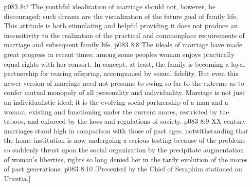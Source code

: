 \vs p083 8:7 The youthful idealization of marriage should not, however, be discouraged; such dreams are the visualization of the future goal of family life. This attitude is both stimulating and helpful providing it does not produce an insensitivity to the realization of the practical and commonplace requirements of marriage and subsequent family life.
\vs p083 8:8 The ideals of marriage have made great progress in recent times; among some peoples woman enjoys practically equal rights with her consort. In concept, at least, the family is becoming a loyal partnership for rearing offspring, accompanied by sexual fidelity. But even this newer version of marriage need not presume to swing so far to the extreme as to confer mutual monopoly of all personality and individuality. Marriage is not just an individualistic ideal; it is the evolving social partnership of a man and a woman, existing and functioning under the current mores, restricted by the taboos, and enforced by the laws and regulations of society.
\vs p083 8:9 XX century marriages stand high in comparison with those of past ages, notwithstanding that the home institution is now undergoing a serious testing because of the problems so suddenly thrust upon the social organization by the precipitate augmentation of woman’s liberties, rights so long denied her in the tardy evolution of the mores of past generations.
\vsetoff
\vs p083 8:10 [Presented by the Chief of Seraphim stationed on Urantia.]
\quizlink
